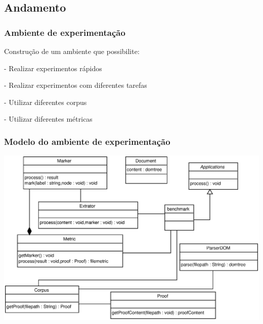\documentclass{beamer}
\newenvironment{my_itemize}{
\begin{itemize}
  \setlength{\itemsep}{5pt}
  \setlength{\parskip}{2pt}
  \setlength{\parsep}{3pt}
}{\end{itemize}}
\begin{document}
\subsection{Andamento}

\begin{frame}
  \frametitle{Ambiente de experimentação}
  \begin{my_itemize}

    \item Construção de um ambiente que possibilite:

    \begin{my_itemize}
      \item[-] Realizar experimentos rápidos
      \item[-] Realizar experimentos com diferentes tarefas
      \pause
      \item[-] Utilizar diferentes corpus
      \item[-] Utilizar diferentes métricas
    \end{my_itemize}
  \end{my_itemize}

\end{frame}

\begin{frame}
\frametitle{Modelo do ambiente de experimentação}
\begin{center}
  \includegraphics[scale=0.43]{img/classes}
\end{center}
\end{frame}
\end{document}
